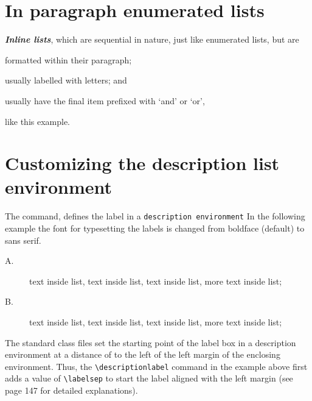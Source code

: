 \section{In paragraph enumerated lists}




\textbf{\itshape Inline lists}, which are
sequential in nature, just like enumerated
lists, but are

\begin{teX}
\begin{inparaenum}
  \item formatted within their paragraph;
  \item usually labelled with letters; and
  \item usually have the final item prefixed with
   `and' or `or',
\end{inparaenum} like this example.
\end{teX}




\section{Customizing the description list environment}
The  command, defines the label in a \texttt{description environment}
In the following example the font for typesetting
the labels is changed from boldface (default) to sans serif.

\begin{teX}
\renewcommand\descriptionlabel[1]%
     {\hspace{\labelsep}\textsf{#1}}
\end{teX}

\renewcommand\descriptionlabel[1]%
{\hspace{\labelsep}\textsf{#1}}

\begin{description}
\item[A.] text inside list, text inside list,
text inside list, more text inside list;
\item[B.] text inside list, text inside list,
text inside list, more text inside list;
\end{description}



The standard \latex class files set the starting point of the label box in a
description environment at a distance of  to the left of the left margin
of the enclosing environment. Thus, the \verb+\descriptionlabel+ command in the
example above first adds a value of \verb+\labelsep+ to start the label aligned with the
left margin (see page 147 for detailed explanations).

